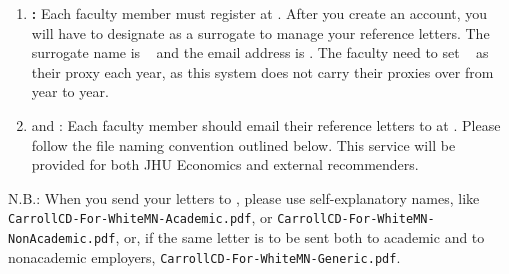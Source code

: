 \documentclass{\econtex}
\begin{document}
\begin{enumerate}
\item \textbf{\AEA:}
  Each faculty member must register at \AEARecLink. After you create an account, you will have to designate {\JMStaffName} as a surrogate to manage your reference letters. The surrogate name is {\JMStaffName}~{\JMStaffNameLast} and the email address is \jmstaffemail. The faculty need to set {\JMStaffName}~{\JMStaffNameLast} as their proxy each year, as this system does not carry their proxies over from year to year. %

\item {\textbf{\AJO} and \Interfolio:}
  Each faculty member should email their reference letters to {\JMStaffName} at \jmstaffemail. Please follow the file naming convention outlined below. This service will be provided for both JHU Economics and external recommenders.

\end{enumerate}

N.B.:  When you send your letters to \jmstaffemail, please use self-explanatory names, like
\texttt{CarrollCD-For-WhiteMN-Academic.pdf}, or
\texttt{CarrollCD-For-WhiteMN-NonAcademic.pdf}, or, if the same letter
is to be sent both to academic and to nonacademic employers,
\texttt{CarrollCD-For-WhiteMN-Generic.pdf}.
\end{document}
